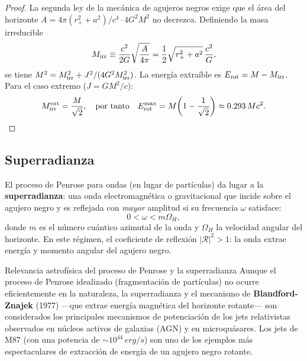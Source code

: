\begin{proof}
La segunda ley de la mecánica de agujeros negros exige que el área del horizonte $A = 4\pi(r_+^2 + a^2)/c^4 \cdot 4G^2M^2$ no decrezca. Definiendo la masa irreducible
\begin{equation}
  M_{\rm irr} \equiv \frac{c^2}{2G}\sqrt{\frac{A}{4\pi}} = \frac{1}{2}\sqrt{r_+^2 + a^2}\,\frac{c^2}{G},
\end{equation}
se tiene $M^2 = M_{\rm irr}^2 + J^2/(4G^2M_{\rm irr}^2)$. La energía extraíble es $E_{\rm rot} = M - M_{\rm irr}$. Para el caso extremo ($J = GM^2/c$):
\begin{equation}
  M_{\rm irr}^{\rm ext} = \frac{M}{\sqrt{2}},
  \quad \text{por tanto} \quad
  E_{\rm rot}^{\rm max} = M\!\left(1 - \frac{1}{\sqrt{2}}\right) \approx 0.293\,Mc^2.
\end{equation}
\end{proof}

\subsection{Superradianza}

El proceso de Penrose para ondas (en lugar de partículas) da lugar a la \textbf{superradianza}: una onda electromagnética o gravitacional que incide sobre el agujero negro y es reflejada con \emph{mayor} amplitud si su frecuencia $\omega$ satisface:
\begin{equation}
  0 < \omega < m\Omega_H,
  \label{eq:cond_superradianza}
\end{equation}
donde $m$ es el número cuántico azimutal de la onda y $\Omega_H$ la velocidad angular del horizonte. En este régimen, el coeficiente de reflexión $|\mathcal{R}|^2 > 1$: la onda extrae energía y momento angular del agujero negro.

\begin{observacion}{Relevancia astrofísica del proceso de Penrose y la superradianza}{}
Aunque el proceso de Penrose idealizado (fragmentación de partículas) no ocurre eficientemente en la naturaleza, la superradianza y el mecanismo de \textbf{Blandford-Znajek} (1977) —que extrae energía magnética del horizonte rotante— son considerados los principales mecanismos de potenciación de los jets relativistas observados en núcleos activos de galaxias (AGN) y en microquásares. Los jets de M87 (con una potencia de $\sim 10^{44}\,\si{erg/s}$) son uno de los ejemplos más espectaculares de extracción de energía de un agujero negro rotante.
\end{observacion}

